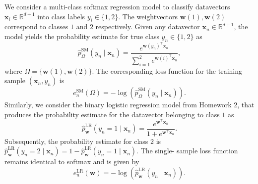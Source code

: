 \documentclass{article}
\newcommand{\R}{\mathbb{R}}
\renewcommand{\vec}[1]{\mathbf{#1}}
\begin{document}
    We consider a multi-class softmax regression model to classify datavectors
    $\vec{x}_i\in\R^{d+1}$ into class labels $y_i\in\{1,2\}$. The 
    weightvectors $\vec{w}(1), \vec{w}(2)$ correspond to classes $1$ and $2$ 
    respectively. Given any datavector $\vec{x}_n\in\R^{d+1}$, the model 
    yields the probability estimate for true class $y_n \in \{1, 2\}$ as
    \begin{equation}
        \label{eqn:softmax}
        \hat{p}^{\text{SM}}_{\Omega}(y_n\mid\vec{x}_n) = \frac{e^{\vec{w}(y_n)
        ^\top\vec{x}_n}}{\sum_{i=1}^2e^{\vec{w}(i)^\top\vec{x}_n}},
    \end{equation}
    where $\Omega = \{\vec{w}(1), \vec{w}(2)\}$. The corresponding loss 
    function for the training sample $(\vec{x}_n,y_n)$ is
    \begin{equation}
        \label{eqn:loss}
        e_n^{\text{SM}}(\Omega) = -\log\left(\hat{p}^{\text{SM}}_{\Omega}
        (y_n\mid\vec{x}_n)\right).
    \end{equation}
    Similarly, we consider the binary logistic regression model from Homework 
    2, that produces the probability estimate for the datavector belonging to
    class $1$ as
    \begin{equation}
        \label{eqn:logistic}
        \hat{p}^{\text{LR}}_{\vec{w}}(y_n=1\mid\vec{x}_n) = \frac{e^{\vec{w}
        ^\top\vec{x}_n}}{1+e^{\vec{w}^\top\vec{x}_n}}.
    \end{equation}
    Subsequently, the probability estimate for class $2$ is $\hat{p}^{\text
    {LR}}_{\vec{w}}(y_n=2\mid\vec{x}_n) = 1-\hat{p}^{\text{LR}}_{\vec{w}}
    (y_n=1\mid\vec{x}_n)$. The single- sample loss function remains identical
    to softmax and is given by
    \begin{equation}
        e_n^{\text{LR}}(\vec{w}) = -\log\left(\hat{p}^{\text{LR}}_{\vec{w}}
        (y_n\mid\vec{x}_n)\right).
    \end{equation}
\end{document}
